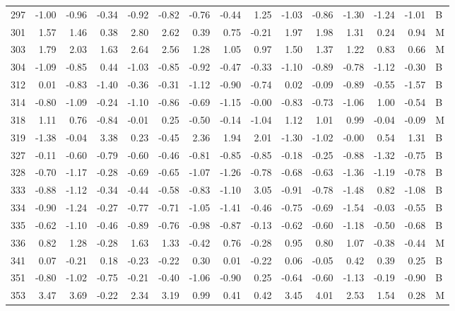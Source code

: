 \begin{table}[ht]
\begin{tabular}{rrrrrrrrrrrrrrl}
  297 & -1.00 & -0.96 & -0.34 & -0.92 & -0.82 & -0.76 & -0.44 & 1.25 & -1.03 & -0.86 & -1.30 & -1.24 & -1.01 & B \\ 
  301 & 1.57 & 1.46 & 0.38 & 2.80 & 2.62 & 0.39 & 0.75 & -0.21 & 1.97 & 1.98 & 1.31 & 0.24 & 0.94 & M \\ 
  303 & 1.79 & 2.03 & 1.63 & 2.64 & 2.56 & 1.28 & 1.05 & 0.97 & 1.50 & 1.37 & 1.22 & 0.83 & 0.66 & M \\ 
  304 & -1.09 & -0.85 & 0.44 & -1.03 & -0.85 & -0.92 & -0.47 & -0.33 & -1.10 & -0.89 & -0.78 & -1.12 & -0.30 & B \\ 
  312 & 0.01 & -0.83 & -1.40 & -0.36 & -0.31 & -1.12 & -0.90 & -0.74 & 0.02 & -0.09 & -0.89 & -0.55 & -1.57 & B \\ 
  314 & -0.80 & -1.09 & -0.24 & -1.10 & -0.86 & -0.69 & -1.15 & -0.00 & -0.83 & -0.73 & -1.06 & 1.00 & -0.54 & B \\ 
  318 & 1.11 & 0.76 & -0.84 & -0.01 & 0.25 & -0.50 & -0.14 & -1.04 & 1.12 & 1.01 & 0.99 & -0.04 & -0.09 & M \\ 
  319 & -1.38 & -0.04 & 3.38 & 0.23 & -0.45 & 2.36 & 1.94 & 2.01 & -1.30 & -1.02 & -0.00 & 0.54 & 1.31 & B \\ 
  327 & -0.11 & -0.60 & -0.79 & -0.60 & -0.46 & -0.81 & -0.85 & -0.85 & -0.18 & -0.25 & -0.88 & -1.32 & -0.75 & B \\ 
  328 & -0.70 & -1.17 & -0.28 & -0.69 & -0.65 & -1.07 & -1.26 & -0.78 & -0.68 & -0.63 & -1.36 & -1.19 & -0.78 & B \\ 
  333 & -0.88 & -1.12 & -0.34 & -0.44 & -0.58 & -0.83 & -1.10 & 3.05 & -0.91 & -0.78 & -1.48 & 0.82 & -1.08 & B \\ 
  334 & -0.90 & -1.24 & -0.27 & -0.77 & -0.71 & -1.05 & -1.41 & -0.46 & -0.75 & -0.69 & -1.54 & -0.03 & -0.55 & B \\ 
  335 & -0.62 & -1.10 & -0.46 & -0.89 & -0.76 & -0.98 & -0.87 & -0.13 & -0.62 & -0.60 & -1.18 & -0.50 & -0.68 & B \\ 
  336 & 0.82 & 1.28 & -0.28 & 1.63 & 1.33 & -0.42 & 0.76 & -0.28 & 0.95 & 0.80 & 1.07 & -0.38 & -0.44 & M \\ 
  341 & 0.07 & -0.21 & 0.18 & -0.23 & -0.22 & 0.30 & 0.01 & -0.22 & 0.06 & -0.05 & 0.42 & 0.39 & 0.25 & B \\ 
  351 & -0.80 & -1.02 & -0.75 & -0.21 & -0.40 & -1.06 & -0.90 & 0.25 & -0.64 & -0.60 & -1.13 & -0.19 & -0.90 & B \\ 
  353 & 3.47 & 3.69 & -0.22 & 2.34 & 3.19 & 0.99 & 0.41 & 0.42 & 3.45 & 4.01 & 2.53 & 1.54 & 0.28 & M \\ 

\end{tabular}
\end{table}
